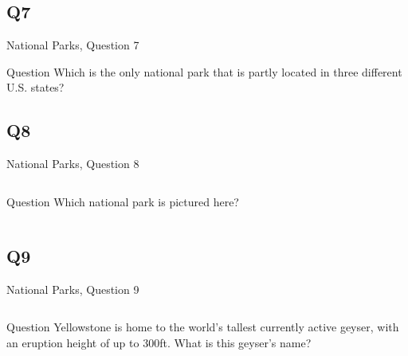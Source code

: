 \documentclass[11pt]{beamer}
\begin{document}
\subsection*{Q7}
\begin{frame}[t]{National Parks, Question 7}
\begin{block}{Question}
Which is the only national park that is partly located in three different U.S. states?
\end{block}
\end{frame}
\subsection*{Q8}
\begin{frame}[t]{National Parks, Question 8}
\begin{columns}[T,totalwidth=\linewidth]
\begin{column}{0.32\linewidth}
\begin{block}{Question}
Which national park is pictured here?
\end{block}
\end{column}
\begin{column}{0.65\linewidth}
\begin{center}
\texttt{[image: \{Images/brycecanyon]}.jpg}
\end{center}
\end{column}
\end{columns}
\end{frame}
\subsection*{Q9}
\begin{frame}[t]{National Parks, Question 9}
\begin{columns}[T,totalwidth=\linewidth]
\begin{column}{0.32\linewidth}
\begin{block}{Question}
Yellowstone is home to the world's tallest currently active geyser, with an eruption height of up to 300ft. What is this geyser's name?
\end{block}
\end{column}
\begin{column}{0.65\linewidth}
\begin{center}
\texttt{[image: \{Images/steamboargeyser]}.jpg}
\end{center}
\end{column}
\end{columns}
\end{frame}
\end{document}
